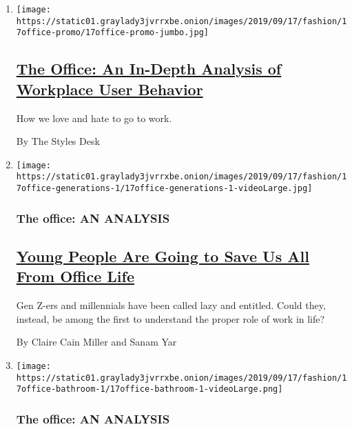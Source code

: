 \begin{enumerate}
\def\labelenumi{\arabic{enumi}.}
\item
  \texttt{[image: https://static01.graylady3jvrrxbe.onion/images/2019/09/17/fashion/17office-promo/17office-promo-jumbo.jpg]}

  \hypertarget{the-office-an-in-depth-analysis-of-workplace-user-behavior}{%
  \subsection{\texorpdfstring{\href{/interactive/2019/09/17/style/the-office.html}{The
  Office: An In-Depth Analysis of Workplace User
  Behavior}}{The Office: An In-Depth Analysis of Workplace User Behavior}}\label{the-office-an-in-depth-analysis-of-workplace-user-behavior}}

  How we love and hate to go to work.

  By The Styles Desk
\item
  \texttt{[image: https://static01.graylady3jvrrxbe.onion/images/2019/09/17/fashion/17office-generations-1/17office-generations-1-videoLarge.jpg]}

  \hypertarget{the-office-an-analysis-1}{%
  \subsubsection{The office: AN
  ANALYSIS}\label{the-office-an-analysis-1}}

  \hypertarget{young-people-are-going-to-save-us-all-from-office-life}{%
  \subsection{\texorpdfstring{\href{/2019/09/17/style/generation-z-millennials-work-life-balance.html}{Young
  People Are Going to Save Us All From Office
  Life}}{Young People Are Going to Save Us All From Office Life}}\label{young-people-are-going-to-save-us-all-from-office-life}}

  Gen Z-ers and millennials have been called lazy and entitled. Could
  they, instead, be among the first to understand the proper role of
  work in life?

  By Claire Cain Miller and Sanam Yar
\item
  \texttt{[image: https://static01.graylady3jvrrxbe.onion/images/2019/09/17/fashion/17office-bathroom-1/17office-bathroom-1-videoLarge.png]}

  \hypertarget{the-office-an-analysis-2}{%
  \subsubsection{The office: AN
  ANALYSIS}\label{the-office-an-analysis-2}}


\end{enumerate}
